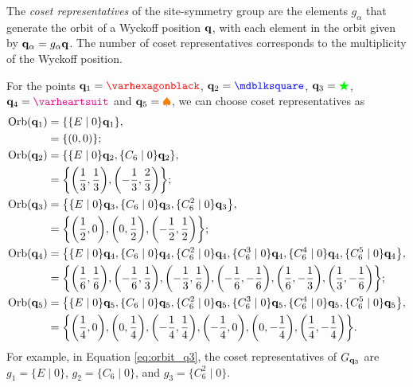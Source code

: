 \begin{definition} \label{def:cosetrep_wyckoff}
The \textit{coset representatives} of the site-symmetry group are the elements \( g_\alpha \) that generate the orbit of a Wyckoff position \( {\vb{q}} \), with each element in the orbit given by \( {\vb{q}}_\alpha = g_\alpha {\vb{q}} \). The number of coset representatives corresponds to the multiplicity of the Wyckoff position.
\end{definition}

\begin{example} \label{ex:coset_representatives_q1q2q3q4q5}
For the points $\q_1 = \textcolor{red}{\varhexagonblack}$, $\q_2 = \textcolor{blue}{\mdblksquare}$, ${\vb{q}}_3 = \textcolor{green}{\bigstar}$, $\q_4 = \textcolor{magenta}{\varheartsuit}$ and ${\vb{q}}_5 = \textcolor{orange}{\spadesuit}$, we can choose coset representatives as
\begin{align}
\text{Orb}({\vb{q}}_1) &= \qty{\{E\mid 0\} {\vb{q}}_1}, \nonumber \\
                 &= \qty{\qty(0,0)}; \label{eq:orbit_q1} \\
\text{Orb}({\vb{q}}_2) &= \qty{\{E\mid 0\} {\vb{q}}_2, \{C_6\mid 0\} {\vb{q}}_2}, \label{eq:orbit_q2} \nonumber \\
                 &= \qty{\qty(\frac{1}{3},\frac{1}{3}),\qty(-\frac{1}{3},\frac{2}{3})}; \\
\text{Orb}({\vb{q}}_3) &= \qty{\{E\mid 0\} {\vb{q}}_3, \{C_6\mid 0\} {\vb{q}}_3, \{C_6^2\mid 0\} {\vb{q}}_3}, \label{eq:orbit_q3} \nonumber \\
                 &= \qty{\qty(\frac{1}{2},0),\qty(0,\frac{1}{2}),\qty(-\frac{1}{2},\frac{1}{2})}; \\
\text{Orb}({\vb{q}}_4) &= \qty{\{E\mid 0\} {\vb{q}}_4, \{C_6\mid 0\} {\vb{q}}_4, \{C_6^2\mid 0\} {\vb{q}}_4, \{C_6^3\mid 0\} {\vb{q}}_4, \{C_6^4\mid 0\} {\vb{q}}_4, \{C_6^5\mid 0\} {\vb{q}}_4}, \label{eq:orbit_q4} \nonumber \\
                 &= \qty{\qty(\frac{1}{6},\frac{1}{6}),\qty(-\frac{1}{6},\frac{1}{3}),\qty(-\frac{1}{3},\frac{1}{6}),\qty(-\frac{1}{6},-\frac{1}{6}),\qty(\frac{1}{6},-\frac{1}{3}),\qty(\frac{1}{3},-\frac{1}{6})}; \\
\text{Orb}({\vb{q}}_5) &= \qty{\{E\mid 0\} {\vb{q}}_5, \{C_6\mid 0\} {\vb{q}}_5, \{C_6^2\mid 0\} {\vb{q}}_5, \{C_6^3\mid 0\} {\vb{q}}_5, \{C_6^4\mid 0\} {\vb{q}}_5, \{C_6^5\mid 0\} {\vb{q}}_5}, \label{eq:orbit_q5} \nonumber \\
                 &= \qty{\qty(\frac{1}{4},0),\qty(0,\frac{1}{4}),\qty(-\frac{1}{4},\frac{1}{4}),\qty(-\frac{1}{4},0),\qty(0,-\frac{1}{4}),\qty(\frac{1}{4},-\frac{1}{4})}.
\end{align}
For example, in Equation \ref{eq:orbit_q3}, the coset representatives of $G_{{\vb{q}}_3}$ are $g_1 = \{E\mid 0\}$, $g_2 = \{C_6\mid 0\}$, and $g_3 = \{C_6^2\mid 0\}$.
\end{example}

